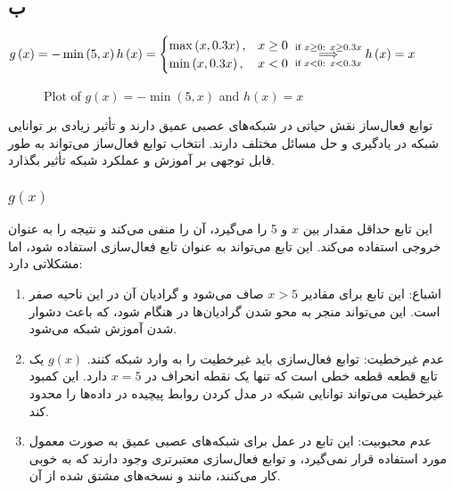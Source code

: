 \documentclass{article}
\begin{document}
\subsection{ب}
\begin{latin}
$
g\left( x \right) = - \min\left( 5, x \right)\\
h\left( x \right) =
\begin{cases}
\max\left( x, 0.3x \right), & x \geq 0\\
\min\left( x, 0.3x \right), & x < 0
\end{cases} \\ \overset{\text{if } x \geq 0: \:\: x \geq 0.3x}{\underset{\text{if } x < 0: \:\: x < 0.3x}{\Longrightarrow }}
h\left( x \right) = x
$

\begin{figure}[htbp]
\centering
{}
\caption{Plot of $g(x) = -\min(5, x)$ and $h(x) = x$}
\end{figure}
\end{latin}
توابع فعال‌ساز نقش حیاتی در شبکه‌های عصبی عمیق دارند و تأثیر زیادی بر توانایی شبکه در یادگیری و حل مسائل مختلف دارند. انتخاب توابع فعال‌ساز می‌تواند به طور قابل توجهی بر آموزش و عملکرد شبکه تأثیر بگذارد.

\subsubsection{$g(x)$}

این تابع حداقل مقدار بین $x$ و 5 را می‌گیرد، آن را منفی می‌کند و نتیجه را به عنوان خروجی استفاده می‌کند. این تابع می‌تواند به عنوان تابع فعال‌سازی استفاده شود، اما مشکلاتی دارد:
\begin{enumerate}
\item    اشباع: این تابع برای مقادیر $x > 5$ صاف می‌شود و گرادیان آن در این ناحیه صفر است. این می‌تواند منجر به محو شدن گرادیان‌ها در هنگام  شود، که باعث دشوار شدن آموزش شبکه می‌شود.

\item    عدم غیرخطیت: توابع فعال‌سازی باید غیرخطیت را به وارد شبکه کنند. $g(x)$ یک تابع قطعه قطعه خطی است که تنها یک نقطه انحراف در $x = 5$ دارد. این کمبود غیرخطیت می‌تواند توانایی شبکه در مدل کردن روابط پیچیده در داده‌ها را محدود کند.

\item    عدم محبوبیت: این تابع در عمل برای شبکه‌های عصبی عمیق به صورت معمول مورد استفاده قرار نمی‌گیرد، و توابع فعال‌سازی معتبرتری وجود دارند که به خوبی کار می‌کنند، مانند  و نسخه‌های مشتق شده از آن.

\end{enumerate}
\end{document}
